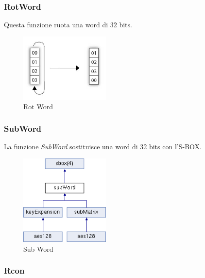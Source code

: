 \subsubsection{RotWord}


\textsf{\small Questa funzione ruota una word di 32 bits.}

\begin{figure}[H]
	\centering
	\includegraphics[width=0.4\textwidth, height=0.4\textheight, keepaspectratio]{./images/key_expansion/key_schedule-rot_word.png}
	\caption{Rot Word}
	\label{fig:rot_word2}
\end{figure}

\subsubsection{SubWord}


\textsf{\small La funzione \emph{SubWord} sostituisce una word di 32 bits con l'S-BOX.}

\begin{figure}[H]
	\centering
	\includegraphics[width=0.4\textwidth, height=0.4\textheight, keepaspectratio]{./images/key_expansion/subWord.png}
	\caption{Sub Word}
	\label{fig:sub_word2}
\end{figure}

\subsubsection{Rcon}

